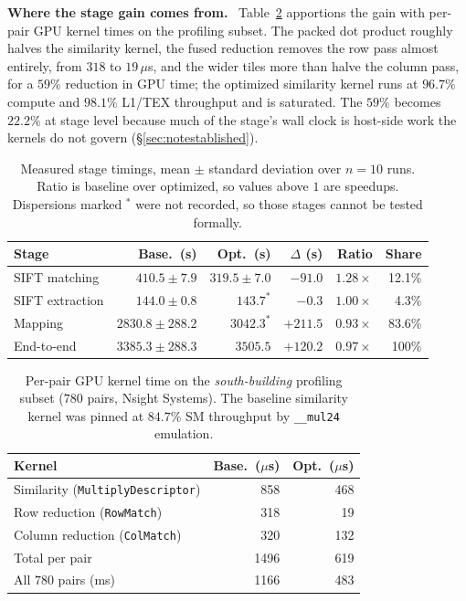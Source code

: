 \documentclass[conference]{IEEEtran}
\newcommand{\para}[1]{\smallskip\noindent\textbf{#1}\ }
\newcommand{\opt}[1]{\texttt{#1}}
\begin{document}
\para{Where the stage gain comes from.} Table~\ref{tab:kernels} apportions the
gain with per-pair GPU kernel times on the profiling subset. The packed dot
product roughly halves the similarity kernel, the fused reduction removes the
row pass almost entirely, from $318$ to $19$\,$\mu$s, and the wider tiles more
than halve the column pass, for a $59\%$ reduction in GPU time; the optimized
similarity kernel runs at $96.7\%$ compute and $98.1\%$ L1/TEX throughput and
is saturated. The $59\%$ becomes $22.2\%$ at stage level because much of the
stage's wall clock is host-side work the kernels do not govern
(\S\ref{sec:notestablished}).

\begin{table}[t]
\centering
\scriptsize
\caption{Measured stage timings, mean $\pm$ standard deviation over $n = 10$
runs. Ratio is baseline over optimized, so values above $1$ are speedups.
Dispersions marked $^\ast$ were not recorded, so those stages cannot be tested
formally.}
\label{tab:timing}
\setlength{\tabcolsep}{3pt}
\begin{tabular}{@{}lrrrrr@{}}
\toprule
Stage & Base.\ (s) & Opt.\ (s) & $\Delta$ (s) & Ratio & Share \\
\midrule
SIFT matching   & $410.5 \pm 7.9$    & $319.5 \pm 7.0$ & $-91.0$  & $1.28\times$ & 12.1\% \\
SIFT extraction & $144.0 \pm 0.8$    & $143.7^\ast$    & $-0.3$   & $1.00\times$ & \phantom{0}4.3\% \\
Mapping         & $2830.8 \pm 288.2$ & $3042.3^\ast$   & $+211.5$ & $0.93\times$ & 83.6\% \\
\midrule
End-to-end      & $3385.3 \pm 288.3$ & $3505.5$        & $+120.2$ & $0.97\times$ & 100\%\phantom{.0} \\
\bottomrule
\end{tabular}
\end{table}

\begin{table}[t]
\centering
\scriptsize
\caption{Per-pair GPU kernel time on the \emph{south-building} profiling
subset ($780$ pairs, Nsight Systems). The baseline similarity kernel was pinned
at $84.7\%$ SM throughput by \opt{\_\_mul24} emulation.}
\label{tab:kernels}
\begin{tabular}{@{}lrr@{}}
\toprule
Kernel & Base.\ ($\mu$s) & Opt.\ ($\mu$s) \\
\midrule
Similarity (\opt{MultiplyDescriptor}) & 858 & 468 \\
Row reduction (\opt{RowMatch})        & 318 & 19 \\
Column reduction (\opt{ColMatch})     & 320 & 132 \\
\midrule
Total per pair                         & 1496 & 619 \\
All $780$ pairs (ms)                   & 1166 & 483 \\
\bottomrule
\end{tabular}
\end{table}
\end{document}

